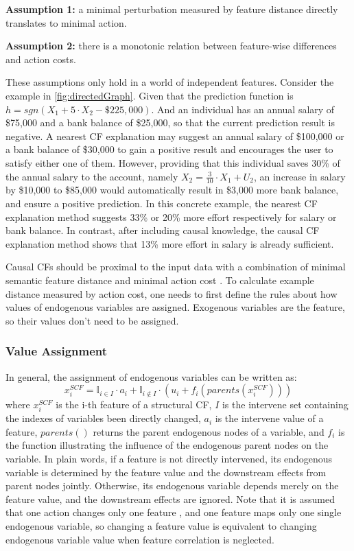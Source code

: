 \noindent \textbf{Assumption 1:} a minimal perturbation measured by feature distance directly translates to minimal action.

\noindent \textbf{Assumption 2:} there is a monotonic relation between feature-wise differences and action costs.

These assumptions only hold in a world of independent features. Consider the example in \autoref{fig:directedGraph}. Given that the prediction function is $h=sgn(X_1+5\cdot X_2-\$225,000)$. And an individual has an annual salary of \$75,000 and a bank balance of \$25,000, so that the current prediction result is negative. A nearest CF explanation may suggest an annual salary of \$100,000 or a bank balance of \$30,000 to gain a positive result and encourages the user to satisfy either one of them. However, providing that this individual saves 30\% of the annual salary to the account, namely $X_2=\frac{3}{10}\cdot X_1+U_2$, an increase in salary by \$10,000 to \$85,000 would automatically result in \$3,000 more bank balance, and ensure a positive prediction. In this concrete example, the nearest CF explanation method suggests 33\% or 20\% more effort respectively for salary or bank balance. In contrast, after including causal knowledge, the causal CF explanation method shows that 13\% more effort in salary is already sufficient.

Causal CFs should be proximal to the input data with a combination of minimal semantic feature distance and minimal action cost \cite{algorithmicrecourse,preservingCausal}. To calculate example distance measured by action cost, one needs to first define the rules about how values of endogenous variables are assigned. Exogenous variables are the feature, so their values don't need to be assigned.
\subsubsection{Value Assignment} In general, the assignment of endogenous variables can be written as:
\begin{equation}\label{eq:SCM}
  x_i^{SCF}=\mathbb{I}_{i\in I}\cdot a_i+\mathbb{I}_{i\notin I}\cdot(u_i+f_i(parents(x_i^{SCF})))
\end{equation}
where $x_i^{SCF}$ is the i-th feature of a structural CF, $I$ is the intervene set containing the indexes of variables been directly changed, $a_i$ is the intervene value of a feature, $parents()$ returns the parent endogenous nodes of a variable, and $f_i$ is the function illustrating the influence of the endogenous parent nodes on the variable. In plain words, if a feature is not directly intervened, its endogenous variable is determined by the feature value and the downstream effects from parent nodes jointly. Otherwise, its endogenous variable depends merely on the feature value, and the downstream effects are ignored. Note that it is assumed that one action changes only one feature \cite{algorithmicrecourse}, and one feature maps only one single endogenous variable, so changing a feature value is equivalent to changing endogenous variable value when feature correlation is neglected.

